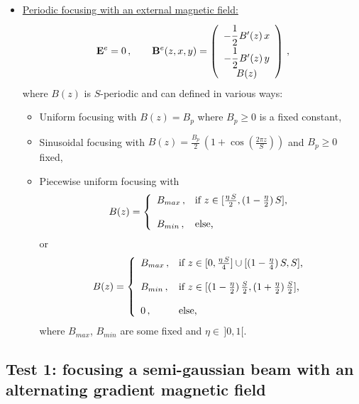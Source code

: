 \documentclass[10pt]{article}
\begin{document}
\begin{itemize}
\item \underline{Periodic focusing with an external magnetic field:}
\begin{equation}
\mathbf{E}^{e} = 0 \, , \qquad \mathbf{B}^{e}(z,x,y) = \left(
\begin{array}{c}
-\cfrac{1}{2}\,B'(z)\,x \\
-\cfrac{1}{2}\,B'(z)\,y \\
B(z)
\end{array}
\right) \, ,
\end{equation}
where $B(z)$ is $S$-periodic and can defined in various ways:
\begin{itemize}
\item Uniform focusing with $B(z) = B_{p}$ where $B_{p} \geq 0$ is a fixed constant,
\item Sinusoidal focusing with $B(z) = \frac{B_{p}}{2}\, (1+\cos(\frac{2\pi z}{S}))$ and $B_{p} \geq 0$ fixed,
\item Piecewise uniform focusing with 
\begin{equation}
B(z) = \left\{
\begin{array}{ll}
B_{max} \, , & \textnormal{if $z \in [\frac{\eta\,S}{2},(1-\frac{\eta}{2})\,S]$,} \\ \\
B_{min} \, , & \textnormal{else,}
\end{array}
\right. 
\end{equation}
or
\begin{equation}
B(z) = \left\{
\begin{array}{ll}
B_{max} \, , & \textnormal{if $z \in [0,\frac{\eta\,S}{4}] \cup [(1-\frac{\eta}{4})\,S,S]$,} \\ \\
B_{min} \, , & \textnormal{if $z \in [(1-\frac{\eta}{2})\,\frac{S}{2},(1+\frac{\eta}{2})\,\frac{S}{2}]$,} \\ \\
0 \, , & \textnormal{else,}
\end{array}
\right.
\end{equation}
where $B_{max}$, $B_{min}$ are some fixed and $\eta \in \, ]0,1[$.
\end{itemize}
\end{itemize}









\subsection{Test 1: focusing a semi-gaussian beam with an alternating gradient magnetic field}
\end{document}
